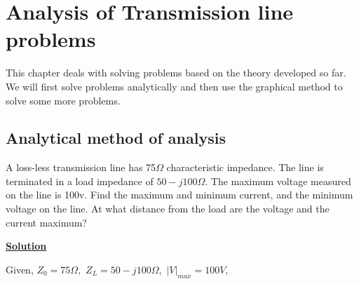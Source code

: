 \chapter{Analysis of Transmission line problems}
This chapter deals with solving problems based on the theory developed so far. We will first solve problems analytically and then use the graphical method to solve some more problems.

\bigskip

\bigskip

\bigskip
\section{\textbf{Analytical method of analysis}}
\begin{example}
	A loss-less transmission line has 75$\Omega$ characteristic impedance. The line is terminated in a load impedance of $50-j100\Omega$. The maximum voltage measured on the line is 100v. Find the maximum and minimum current, and the minimum voltage on the line. At what distance from the load are the voltage and the current maximum?
\end{example}
\begin{center}
	\underline{\textbf{\large Solution}}
\end{center}
Given,
$Z_{0}=75\Omega,$
$Z_{L}=50-j100\Omega,$
$|V|_{max}=100V,$

